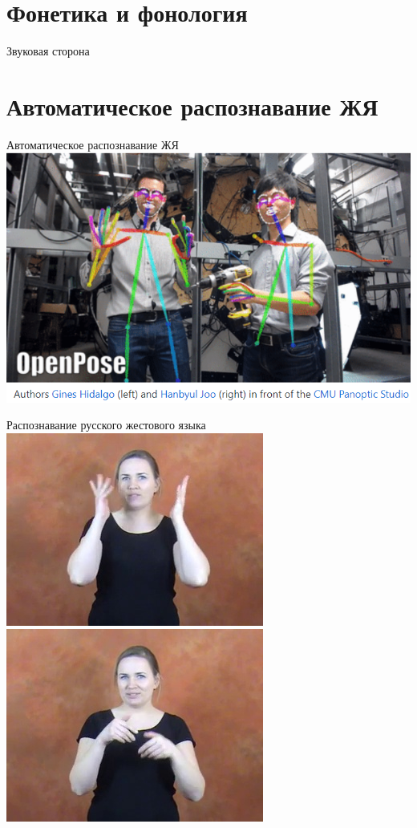 \documentclass[13pt, t]{beamer}
\begin{document}
\section{Фонетика и фонология} %

\begin{frame}{Звуковая сторона}

\end{frame}

\section{Автоматическое распознавание ЖЯ} %
\begin{frame}{Автоматическое распознавание ЖЯ}
    \includegraphics[width=\linewidth]{images/open-pose}
\end{frame}

\begin{frame}{Распознавание русского жестового языка}
    \includegraphics[width=0.49\linewidth]{images/vljubit'sja_frame1.jpg}
    \includegraphics[width=0.49\linewidth]{images/vljubit'sja_frame2.jpg}
\end{frame}
\end{document}
